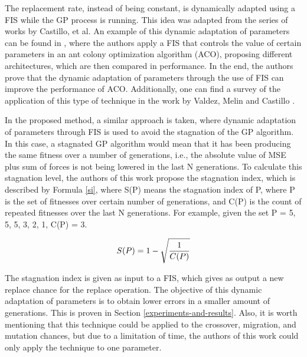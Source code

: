 \documentclass[a4paper,twoside]{article}
\begin{document}

The replacement rate, instead of being constant, is
dynamically adapted using a FIS while the GP process is running. This
idea was adapted from the series of works by Castillo, et al. An
example of this dynamic adaptation of parameters can be found in
\cite{castillo2015new}, where the authors apply a FIS that controls
the value of certain parameters in an ant colony optimization
algorithm (ACO), proposing different architectures, which are then
compared in performance. In the end, the authors
prove that the dynamic adaptation of parameters through the use of FIS
can improve the performance of ACO. Additionally, one can find a
survey of the application of this type of technique in the work by
Valdez, Melin and Castillo \cite{valdez2014survey}. 

In the proposed method, a similar approach is taken, where dynamic
adaptation of parameters through FIS is used to avoid the stagnation
of the GP algorithm. In this case, a stagnated GP algorithm would mean
that it has been producing the same fitness over a number of
generations, i.e., the absolute value of MSE plus sum of forces is not
being lowered in the last N generations. To calculate this stagnation
level, the authors of this work propose the stagnation index, which is
described by Formula \ref{si}, where S(P) means the stagnation index
of P, where P is the set of fitnesses over certain number of
generations, and C(P) is the count of repeated fitnesses over the last
N generations. For example, given the set P = {5, 5, 5, 3, 2, 1}, C(P)
= 3. 

\begin{equation} \label{si}
S(P) = 1 - \sqrt{1 \over C(P)}
\end{equation}

The stagnation index is given as input to a FIS, which gives as output
a new replace chance for the replace operation. The objective of this
dynamic adaptation of parameters is to obtain lower errors in a
smaller amount of generations. This is proven in Section
\ref{experiments-and-results}. Also, it is worth mentioning that this
technique could be applied to the crossover, migration, and mutation
chances, but due to a limitation of time, the authors of this work
could only apply the technique to one parameter. 
\end{document}
